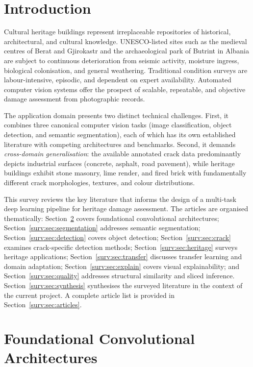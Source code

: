 \documentclass[12pt,a4paper]{article}
\begin{document}
\section{Introduction}
\label{surv:sec:intro}

Cultural heritage buildings represent irreplaceable repositories of historical, architectural, and cultural knowledge. UNESCO-listed sites such as the medieval centres of Berat and Gjirokastr and the archaeological park of Butrint in Albania are subject to continuous deterioration from seismic activity, moisture ingress, biological colonisation, and general weathering. Traditional condition surveys are labour-intensive, episodic, and dependent on expert availability. Automated computer vision systems offer the prospect of scalable, repeatable, and objective damage assessment from photographic records.

The application domain presents two distinct technical challenges. First, it combines three canonical computer vision tasks (image classification, object detection, and semantic segmentation), each of which has its own established literature with competing architectures and benchmarks. Second, it demands \textit{cross-domain generalisation}: the available annotated crack data predominantly depicts industrial surfaces (concrete, asphalt, road pavement), while heritage buildings exhibit stone masonry, lime render, and fired brick with fundamentally different crack morphologies, textures, and colour distributions.

This survey reviews the key literature that informs the design of a multi-task deep learning pipeline for heritage damage assessment. The articles are organised thematically: Section~\ref{surv:sec:backbones} covers foundational convolutional architectures; Section~\ref{surv:sec:segmentation} addresses semantic segmentation; Section~\ref{surv:sec:detection} covers object detection; Section~\ref{surv:sec:crack} examines crack-specific detection methods; Section~\ref{surv:sec:heritage} surveys heritage applications; Section~\ref{surv:sec:transfer} discusses transfer learning and domain adaptation; Section~\ref{surv:sec:explain} covers visual explainability; and Section~\ref{surv:sec:quality} addresses structural similarity and sliced inference. Section~\ref{surv:sec:synthesis} synthesises the surveyed literature in the context of the current project. A complete article list is provided in Section~\ref{surv:sec:articles}.

\section{Foundational Convolutional Architectures}
\label{surv:sec:backbones}
\end{document}
